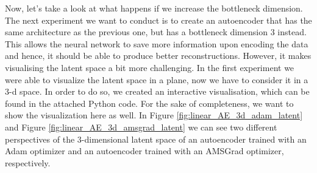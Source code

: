 Now, let's take a look at what happens if we increase the bottleneck dimension. The next experiment we want to conduct is to create an autoencoder that has the same architecture as the previous one, but has a bottleneck dimension $3$ instead. This allows the neural network to save more information upon encoding the data and hence, it should be able to produce better reconstructions. However, it makes visualising the latent space a bit more challenging. In the first experiment we were able to visualize the latent space in a plane, now we have to consider it in a $3$-d space. In order to do so, we created an interactive visualisation, which can be found in the attached Python code. For the sake of completeness, we want to show the visualization here as well. In Figure \ref{fig:linear_AE_3d_adam_latent} and Figure \ref{fig:linear_AE_3d_amsgrad_latent} we can see two different perspectives of the $3$-dimensional latent space of an autoencoder trained with an Adam optimizer and an autoencoder trained with an AMSGrad optimizer, respectively.

